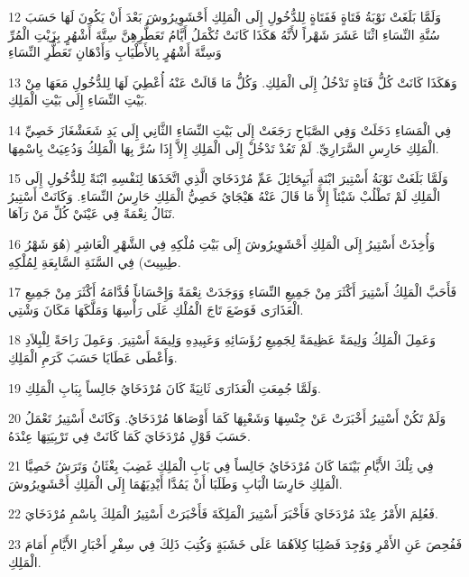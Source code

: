 \par 12 وَلَمَّا بَلَغَتْ نَوْبَةُ فَتَاةٍ فَفَتَاةٍ لِلدُّخُولِ إِلَى الْمَلِكِ أَحْشَوِيرُوشَ بَعْدَ أَنْ يَكُونَ لَهَا حَسَبَ سُنَّةِ النِّسَاءِ اثْنَا عَشَرَ شَهْراً لأَنَّهُ هَكَذَا كَانَتْ تُكْمَلُ أَيَّامُ تَعَطُّرِهِنَّ سِتَّةَ أَشْهُرٍ بِزَيْتِ الْمُرِّ وَسِتَّةَ أَشْهُرٍ بِالأَطْيَابِ وَأَدْهَانِ تَعَطُّرِ النِّسَاءِ
\par 13 وَهَكَذَا كَانَتْ كُلُّ فَتَاةٍ تَدْخُلُ إِلَى الْمَلِكِ. وَكُلُّ مَا قَالَتْ عَنْهُ أُعْطِيَ لَهَا لِلدُّخُولِ مَعَهَا مِنْ بَيْتِ النِّسَاءِ إِلَى بَيْتِ الْمَلِكِ.
\par 14 فِي الْمَسَاءِ دَخَلَتْ وَفِي الصَّبَاحِ رَجَعَتْ إِلَى بَيْتِ النِّسَاءِ الثَّانِي إِلَى يَدِ شَعَشْغَازَ خَصِيِّ الْمَلِكِ حَارِسِ السَّرَارِيِّ. لَمْ تَعُدْ تَدْخُلْ إِلَى الْمَلِكِ إِلاَّ إِذَا سُرَّ بِهَا الْمَلِكُ وَدُعِيَتْ بِاسْمِهَا.
\par 15 وَلَمَّا بَلَغَتْ نَوْبَةُ أَسْتِيرَ ابْنَةِ أَبَيِحَائِلَ عَمِّ مُرْدَخَايَ الَّذِي اتَّخَذَهَا لِنَفْسِهِ ابْنَةً لِلدُّخُولِ إِلَى الْمَلِكِ لَمْ تَطْلُبْ شَيْئاً إِلاَّ مَا قَالَ عَنْهُ هَيْجَايُ خَصِيُّ الْمَلِكِ حَارِسُ النِّسَاءِ. وَكَانَتْ أَسْتِيرُ تَنَالُ نِعْمَةً فِي عَيْنَيْ كُلِّ مَنْ رَآهَا.
\par 16 وَأُخِذَتْ أَسْتِيرُ إِلَى الْمَلِكِ أَحْشَوِيرُوشَ إِلَى بَيْتِ مُلْكِهِ فِي الشَّهْرِ الْعَاشِرِ (هُوَ شَهْرُ طِيبِيتَ) فِي السَّنَةِ السَّابِعَةِ لِمُلْكِهِ.
\par 17 فَأَحَبَّ الْمَلِكُ أَسْتِيرَ أَكْثَرَ مِنْ جَمِيعِ النِّسَاءِ وَوَجَدَتْ نِعْمَةً وَإِحْسَاناً قُدَّامَهُ أَكْثَرَ مِنْ جَمِيعِ الْعَذَارَى فَوَضَعَ تَاجَ الْمُلْكِ عَلَى رَأْسِهَا وَمَلَّكَهَا مَكَانَ وَشْتِي.
\par 18 وَعَمِلَ الْمَلِكُ وَلِيمَةً عَظِيمَةً لِجَمِيعِ رُؤَسَائِهِ وَعَبِيدِهِ وَلِيمَةَ أَسْتِيرَ. وَعَمِلَ رَاحَةً لِلْبِلاَدِ وَأَعْطَى عَطَايَا حَسَبَ كَرَمِ الْمَلِكِ.
\par 19 وَلَمَّا جُمِعَتِ الْعَذَارَى ثَانِيَةً كَانَ مُرْدَخَايُ جَالِساً بِبَابِ الْمَلِكِ.
\par 20 وَلَمْ تَكُنْ أَسْتِيرُ أَخْبَرَتْ عَنْ جِنْسِهَا وَشَعْبِهَا كَمَا أَوْصَاهَا مُرْدَخَايُ. وَكَانَتْ أَسْتِيرُ تَعْمَلُ حَسَبَ قَوْلِ مُرْدَخَايَ كَمَا كَانَتْ فِي تَرْبِيَتِهَا عِنْدَهُ.
\par 21 فِي تِلْكَ الأَيَّامِ بَيْنَمَا كَانَ مُرْدَخَايُ جَالِساً فِي بَابِ الْمَلِكِ غَضِبَ بِغْثَانُ وَتَرَشُ خَصِيَّا الْمَلِكِ حَارِسَا الْبَابِ وَطَلَبَا أَنْ يَمُدَّا أَيْدِيَهُمَا إِلَى الْمَلِكِ أَحْشَوِيرُوشَ.
\par 22 فَعُلِمَ الأَمْرُ عِنْدَ مُرْدَخَايَ فَأَخْبَرَ أَسْتِيرَ الْمَلِكَةَ فَأَخْبَرَتْ أَسْتِيرُ الْمَلِكَ بِاسْمِ مُرْدَخَايَ.
\par 23 فَفُحِصَ عَنِ الأَمْرِ وَوُجِدَ فَصُلِبَا كِلاَهُمَا عَلَى خَشَبَةٍ وَكُتِبَ ذَلِكَ فِي سِفْرِ أَخْبَارِ الأَيَّامِ أَمَامَ الْمَلِكِ.

